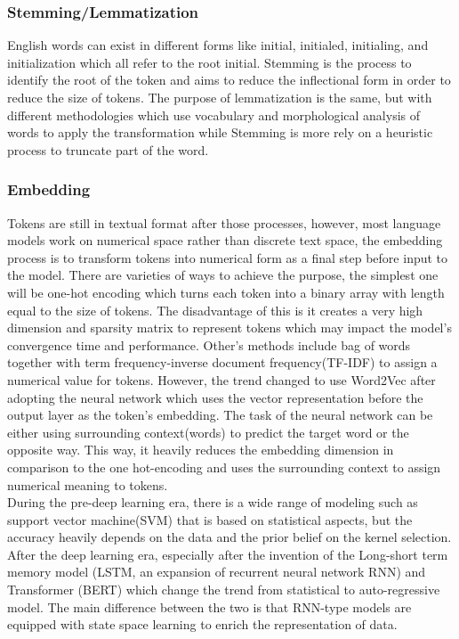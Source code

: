 \documentclass[12pt]{article}
\begin{document}
\subsubsection{Stemming/Lemmatization}
English words can exist in different forms like initial, initialed, initialing, and initialization which all refer to the root initial. Stemming is the process to identify the root of the token and aims to reduce the inflectional form in order to reduce  the size of tokens. The purpose of lemmatization is the same, but with different methodologies which use vocabulary and morphological analysis of words to apply the transformation while Stemming is more rely on a heuristic process to truncate part of the word.

\subsubsection{Embedding}
Tokens are still in textual format after those processes, however, most language models work on numerical space rather than discrete text space, the embedding process is to transform tokens into numerical form as a final step before input to the model. There are varieties of ways to achieve the purpose, the simplest one will be one-hot encoding which turns each token into a binary array with length equal to the size of tokens. The disadvantage of this is it creates a very high dimension and  sparsity matrix to represent tokens which may impact the model's convergence time and performance. Other's methods include bag of words together with term frequency-inverse document frequency(TF-IDF) to assign a numerical value for tokens. However, the trend changed to use Word2Vec after adopting the neural network which uses the vector representation before the output layer as the token's embedding. The task of the neural network can be either using surrounding context(words) to predict the target word or the opposite way. This way, it heavily reduces the embedding dimension in comparison to the one hot-encoding and uses the surrounding context to assign numerical meaning to tokens.\\
 
During the pre-deep learning era, there is a wide range of modeling such as support vector machine(SVM) that is based on statistical aspects, but the accuracy heavily depends on the data and the prior belief on the kernel selection. After the deep learning era, especially after the invention of the Long-short term memory model (LSTM, an expansion of recurrent neural network RNN) and Transformer (BERT) which change the trend from statistical to auto-regressive model.  The main difference between the two is that RNN-type models are equipped with state space learning\cite{Siegelmann_1995} to enrich the representation of data. \\
\end{document}
